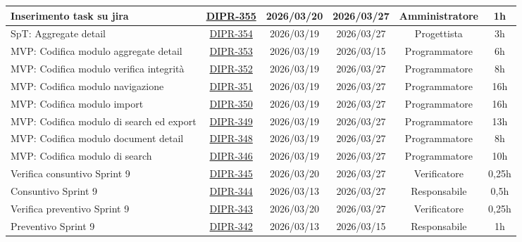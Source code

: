 \documentclass[a4paper,12pt]{article}
\begin{document}
\begin{spacing}{1}
\begin{longtable}{|p{4cm}|c|c|c|c|c|}
        \hline
        Inserimento task su jira & \href{https://7zpus.atlassian.net/browse/DIPR-355}{DIPR-355} & 2026/03/20 & 2026/03/27 & Amministratore & 1h \\
        \hline
        [FRONTEND] SpT: Aggregate detail & \href{https://7zpus.atlassian.net/browse/DIPR-354}{DIPR-354} & 2026/03/19 & 2026/03/27 & Progettista & 3h \\
        \hline
        [FRONTEND] MVP: Codifica modulo aggregate detail & \href{https://7zpus.atlassian.net/browse/DIPR-353}{DIPR-353} & 2026/03/19 & 2026/03/15 & Programmatore & 6h \\
        \hline
        [FRONTEND] MVP: Codifica modulo verifica integrità & \href{https://7zpus.atlassian.net/browse/DIPR-352}{DIPR-352} & 2026/03/19 & 2026/03/27 & Programmatore & 8h \\
        \hline
        [FRONTEND] MVP: Codifica modulo navigazione & \href{https://7zpus.atlassian.net/browse/DIPR-351}{DIPR-351} & 2026/03/19 & 2026/03/27 & Programmatore & 16h \\
        \hline
        [FRONTEND] MVP: Codifica modulo import & \href{https://7zpus.atlassian.net/browse/DIPR-350}{DIPR-350}& 2026/03/19 & 2026/03/27 & Programmatore & 16h \\
        \hline
        [BACKEND] MVP: Codifica modulo di search ed export & \href{https://7zpus.atlassian.net/browse/DIPR-349}{DIPR-349} & 2026/03/19 & 2026/03/27 & Programmatore & 13h \\
        \hline
        [FRONTEND] MVP: Codifica modulo document detail & \href{https://7zpus.atlassian.net/browse/DIPR-348}{DIPR-348} & 2026/03/19 & 2026/03/27 & Programmatore & 8h \\
        \hline
        [FRONTEND] MVP: Codifica modulo di search & \href{https://7zpus.atlassian.net/browse/DIPR-346}{DIPR-346} & 2026/03/19 & 2026/03/27 & Programmatore & 10h \\
        \hline
        Verifica consuntivo Sprint 9 & \href{https://7zpus.atlassian.net/browse/DIPR-345}{DIPR-345} & 2026/03/20 & 2026/03/27 & Verificatore & 0,25h \\
        \hline
        Consuntivo Sprint 9 & \href{https://7zpus.atlassian.net/browse/DIPR-344}{DIPR-344} & 2026/03/13 & 2026/03/27 & Responsabile & 0,5h \\
        \hline
        Verifica preventivo Sprint 9 & \href{https://7zpus.atlassian.net/browse/DIPR-343}{DIPR-343} & 2026/03/20 & 2026/03/27 & Verificatore & 0,25h \\
        \hline
        Preventivo Sprint 9 & \href{https://7zpus.atlassian.net/browse/DIPR-342}{DIPR-342} & 2026/03/13 & 2026/03/15 & Responsabile & 1h \\

\end{longtable}
\end{spacing}
\end{document}
